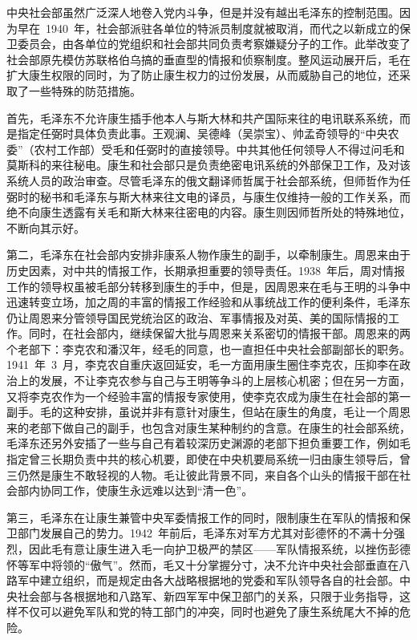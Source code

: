 中央社会部虽然广泛深人地卷入党内斗争，但是并没有越出毛泽东的控制范围。因为早在~1940~年，社会部派驻各单位的特派员制度就被取消，而代之以新成立的保卫委员会，由各单位的党组织和社会部共同负责考察嫌疑分子的工作。此举改变了社会部原先模仿苏联格伯乌搞的垂直型的情报和侦察制度。整风运动展开后，毛在扩大康生权限的同时，为了防止康生权力的过份发展，从而威胁自己的地位，还采取了一些特殊的防范措施。

首先，毛泽东不允许康生插手他本人与斯大林和共产国际来往的电讯联系系统，而是指定任弼时具体负责此事。王观澜、吴德峰（吴崇宝）、帅孟奇领导的“中央农委”（农村工作部）受毛和任弼时的直接领导。中共其他任何领导人不得过问毛和莫斯科的来往秘电。康生和社会部只是负责绝密电讯系统的外部保卫工作，及对该系统人员的政治审查。尽管毛泽东的俄文翻译师哲属于社会部系统，但师哲作为任弼时的秘书和毛泽东与斯大林来往文电的译员，与康生仅维持一般的工作关系，而绝不向康生透露有关毛和斯大林来往密电的内容。康生则因师哲所处的特殊地位，不断向其示好。

第二，毛泽东在社会部内安排非康系人物作康生的副手，以牵制康生。周恩来由于历史因素，对中共的情报工作，长期承担重要的领导责任。1938~年后，周对情报工作的领导权虽被毛部分转移到康生的手中，但是，因周恩来在毛与王明的斗争中迅速转变立场，加之周的丰富的情报工作经验和从事统战工作的便利条件，毛泽东仍让周恩来分管领导国民党统治区的政治、军事情报及对英、美的国际情报的工作。同时，在社会部内，继续保留大批与周恩来关系密切的情报干部。周恩来的两个老部下：李克农和潘汉年，经毛的同意，也一直担任中央社会部副部长的职务。1941~年~3~月，李克农自重庆返回延安，毛一方面用康生圈住李克农，压抑李在政治上的发展，不让李克农参与自己与王明等争斗的上层核心机密；但在另一方面，又将李克农作为一个经验丰富的情报专家使用，使李克农成为康生在社会部的第一副手。毛的这种安排，虽说并非有意针对康生，但站在康生的角度，毛让一个周恩来的老部下做自己的副手，也包含对康生某种制约的含意。在康生的社会部系统，毛泽东还另外安插了一些与自己有着较深历史渊源的老部下担负重要工作，例如毛指定曾三长期负责中共的核心机要，即使在中央机要局系统一归由康生领导后，曾三仍然是康生不敢轻视的人物。毛让彼此背景不同，来自各个山头的情报干部在社会部内协同工作，使康生永远难以达到“清一色”。

第三，毛泽东在让康生兼管中央军委情报工作的同时，限制康生在军队的情报和保卫部门发展自己的势力。1942~年前后，毛泽东对军方尤其对彭德怀的不满十分强烈，因此毛有意让康生进入毛一向护卫极严的禁区——军队情报系统，以挫伤彭德怀等军中将领的“傲气”。然而，毛又十分掌握分寸，决不允许中央社会部垂直在八路军中建立组织，而是规定由各大战略根据地的党委和军队领导各自的社会部。中央社会部与各根据地和八路军、新四军军中保卫部门的关系，只限于业务指导，这样不仅可以避免军队和党的特工部门的冲突，同时也避免了康生系统尾大不掉的危险。

